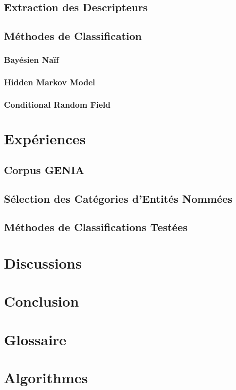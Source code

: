 \documentclass[11pt,a4paper]{report}
\begin{document}
	\section{Extraction des Descripteurs}
		
	\section{Méthodes de Classification}
		\subsection{Bayésien Naïf}
			
  		\subsection{Hidden Markov Model}
  		\subsection{Conditional Random Field}
  
  
\chapter{Expériences}
  	\section{Corpus GENIA}
  		
  	\section{Sélection des Catégories d'Entités Nommées}
  	\section{Méthodes de Classifications Testées}

\chapter{Discussions}


\chapter*{Conclusion}
	
	
\begin{appendices}
	\chapter{Glossaire}
		
	\chapter{Algorithmes}

	
	
\end{appendices}
\newpage
\newpage
\newpage
\end{document}
